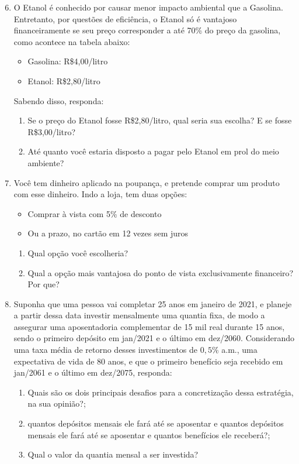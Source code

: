 \begin{enumerate}\setcounter{enumi}{5}
\item O Etanol é conhecido por causar menor impacto ambiental que a Gasolina. Entretanto, por questões de eficiência, o Etanol só é vantajoso financeiramente se seu preço corresponder a até 70\% do preço da gasolina, como acontece na tabela abaixo:
  \begin{itemize}

  \item Gasolina: R\$4{,}00/litro 
  \item Etanol: R\$2,80/litro 

  \end{itemize}
Sabendo disso, responda:
  \begin{enumerate}
     \item Se o preço do Etanol fosse R\$2,80/litro, qual seria sua escolha? E se fosse R\$3{,}00/litro?
     \item Até quanto você estaria disposto a pagar pelo Etanol em prol do meio ambiente?
  \end{enumerate}

\item Você tem dinheiro aplicado na poupança, e pretende comprar um produto com esse dinheiro. Indo a loja, tem duas opções:
  \begin{itemize}
  \item Comprar à vista com 5\% de desconto
  \item Ou a prazo, no cartão em 12 vezes sem juros
  \end{itemize}

  \begin{enumerate}
  \item Qual opção você escolheria?
  \item Qual a opção mais vantajosa do ponto de vista exclusivamente financeiro? Por que?
  \end{enumerate}

\item Suponha que uma pessoa vai completar 25 anos em janeiro de 2021, e planeje a partir dessa data investir mensalmente uma quantia fixa, de modo a assegurar uma aposentadoria complementar de 15 mil real durante 15 anos, sendo o primeiro depósito em jan/2021 e o último em dez/2060. Considerando uma taxa média de retorno desses investimentos de $0{,}5$\% a.m., uma expectativa de vida de 80 anos, e que o primeiro benefício seja recebido em jan/2061 e o último em dez/2075, responda:

\begin{enumerate}
  \item Quais são os dois principais desafios para a concretização dessa estratégia, na sua opinião?;
  \item quantos depósitos mensais ele fará até se aposentar e quantos depósitos mensais ele fará até se aposentar e quantos benefícios ele receberá?;
  \item Qual o valor da quantia mensal a ser investida?
\end{enumerate}


\end{enumerate}
